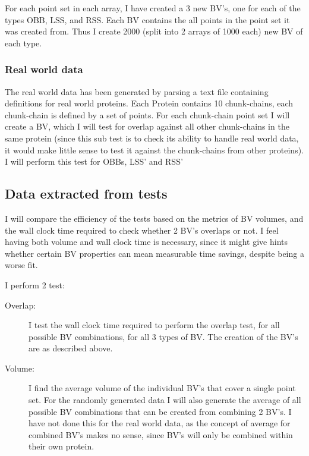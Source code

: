 For each point set in each array, I have created a 3 new BV's, one for
each of the types OBB, LSS, and RSS. Each BV contains the all points
in the point set it was created from. Thus I create 2000 (split into 2 arrays of 1000 each)
new BV of each type. \\ 

\subsubsection{Real world data}
The real world data has been generated by parsing a text file containing definitions for real world proteins. Each Protein contains 10 chunk-chains, each chunk-chain is defined by a set of points. For each chunk-chain point set I will create a BV, which I will test for overlap against all other chunk-chains in the same protein (since this sub test is to check its ability to handle real world data, it would make little sense to test it against the chunk-chains from other proteins). 
I will perform this test for OBBs, LSS' and RSS'

\subsection{Data extracted from tests}

I will compare the efficiency of the tests based on the metrics of BV volumes, and the wall clock time required to check whether 2 BV's overlaps or not. I feel having both volume and wall clock time is necessary, since it might give hints whether certain BV properties can mean measurable time savings, despite being a worse fit. 

I perform 2 test: 
\begin{description}
\item[Overlap:] I test the wall clock time required to perform the overlap test,
  for all possible BV combinations, for all 3 types of BV. The creation of the BV's are as described above.
 
\item[Volume:] I find the average volume of the individual BV's that cover a single point set. For the randomly generated data I will also generate the average of all possible BV combinations that can be created from combining 2 BV's. I have not done this for the real world data, as the concept of average for combined BV's makes no sense, since BV's will only be combined within their own protein.
\end{description}

